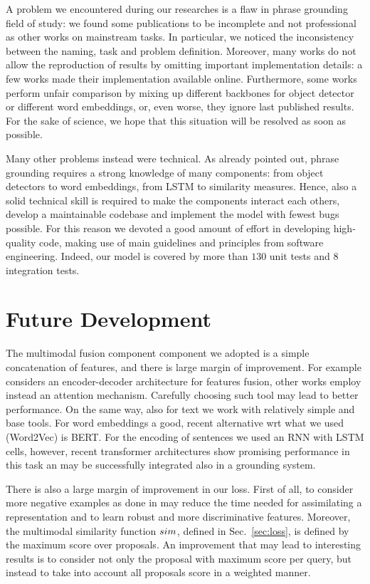 A problem we encountered during our researches is a flaw in phrase
grounding field of study: we found some publications to be incomplete
and not professional as other works on mainstream tasks. In
particular, we noticed the inconsistency between the naming, task and
problem definition. Moreover, many works do not allow the reproduction
of results by omitting important implementation details: a few works
made their implementation available online. Furthermore, some works
perform unfair comparison by mixing up different backbones for object
detector or different word embeddings, or, even worse, they ignore
last published results. For the sake of science, we hope that this
situation will be resolved as soon as possible.

Many other problems instead were technical. As already pointed out,
phrase grounding requires a strong knowledge of many components: from
object detectors to word embeddings, from LSTM to similarity measures.
Hence, also a solid technical skill is required to make the components
interact each others, develop a maintainable codebase and implement
the model with fewest bugs possible. For this reason we devoted a good
amount of effort in developing high-quality code, making use of main
guidelines and principles from software engineering. Indeed, our model
is covered by more than $130$ unit tests and $8$ integration tests.

\section{Future Development}

The multimodal fusion component component we adopted is a simple
concatenation of features, and there is large margin of improvement.
For example \cite{datta2019align2ground} considers an encoder-decoder
architecture for features fusion, other works employ instead an
attention mechanism. Carefully choosing such tool may lead to better
performance. On the same way, also for text we work with relatively
simple and base tools. For word embeddings a good, recent alternative
wrt what we used (Word2Vec) is BERT. For the encoding of sentences we
used an RNN with LSTM cells, however, recent transformer architectures
show promising performance in this task an may be successfully
integrated also in a grounding system.

There is also a large margin of improvement in our loss. First of all,
to consider more negative examples as done in \cite{wang2020maf} may
reduce the time needed for assimilating a representation and to learn
robust and more discriminative features. Moreover, the multimodal
similarity function $sim$, defined in Sec.~\ref{sec:loss}, is
defined by the maximum score over proposals. An improvement that may
lead to interesting results is to consider not only the proposal with
maximum score per query, but instead to take into account all
proposals score in a weighted manner.

